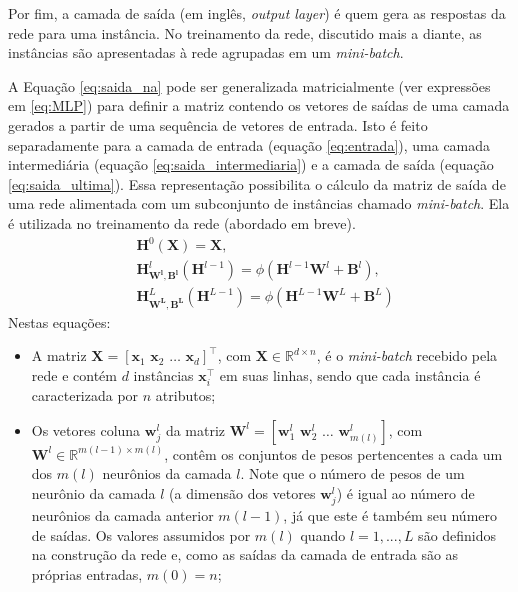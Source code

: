 \documentclass[a4paper]{article}
\begin{document}
\begin{multicols}{2}
    Por fim, a camada de saída (em inglês, \emph{output layer}) é quem gera as respostas da rede para uma instância. No treinamento da rede, discutido mais a diante, as instâncias são apresentadas à rede agrupadas em um \textit{mini-batch}.
    
    A Equação \eqref{eq:saida_na} pode ser generalizada matricialmente (ver expressões em \eqref{eq:MLP}) para definir a matriz contendo os vetores de saídas de uma camada gerados a partir de uma sequência de vetores de entrada. Isto é feito separadamente para a camada de entrada (equação \eqref{eq:entrada}), uma camada intermediária (equação \eqref{eq:saida_intermediaria}) e a camada de saída (equação \eqref{eq:saida_ultima}). Essa representação possibilita o cálculo da matriz de saída de uma rede alimentada com um subconjunto de instâncias chamado \textit{mini-batch}. Ela é utilizada no treinamento da rede (abordado em breve).
\begin{subequations}
\begin{align}
& \mathbf{H}^0(\mathbf{X}) = \mathbf{X}, \label{eq:entrada}\\
& \mathbf{H}_{\mathbf{W^l,B^l}}^l(\mathbf{H}^{l-1}) = \phi(\mathbf{H}^{l-1}\mathbf{W}^l + \mathbf{B}^l), \label{eq:saida_intermediaria}\\
& \mathbf{H}_{\mathbf{W^L,B^L}}^L(\mathbf{H}^{L-1}) = \phi(\mathbf{H}^{L-1}\mathbf{W}^L + \mathbf{B}^L) \label{eq:saida_ultima}
\end{align}
\label{eq:MLP}
\end{subequations}
Nestas equações: 
\begin{itemize}[noitemsep]
    \item A matriz $\mathbf{X} = [\mathbf{x}_1 \,\, \mathbf{x}_2 \,\, \dots \,\, \mathbf{x}_d]^\top$, com $\mathbf{X} \in \mathbb{R}^{d \times n}$, é o \textit{mini-batch} recebido pela rede e contém $d$ instâncias $\mathbf{x}_i^\top$ em suas linhas, sendo que cada instância é caracterizada por $n$ atributos; 
    \item Os vetores coluna $\mathbf{w}_j^l$ da matriz $\mathbf{W}^l = [\mathbf{w}_1^l \,\, \mathbf{w}_2^l \,\, \dots \,\, \mathbf{w}_{m(l)}^l]$, com $\mathbf{W}^l \in \mathbb{R}^{m(l-1) \times m(l)}$, contêm os conjuntos de pesos pertencentes a cada um dos $m(l)$ neurônios da camada $l$. Note que o número de pesos de um neurônio da camada $l$ (a dimensão dos vetores $\mathbf{w}_j^l$) é igual ao número de neurônios da camada anterior $m(l-1)$, já que este é também seu número de saídas. Os valores assumidos por $m(l)$ quando $l = 1, ..., L$ são definidos na construção da rede e, como as saídas da camada de entrada são as próprias entradas, $m(0) = n$; 

\end{itemize}
\end{multicols}
\end{document}
